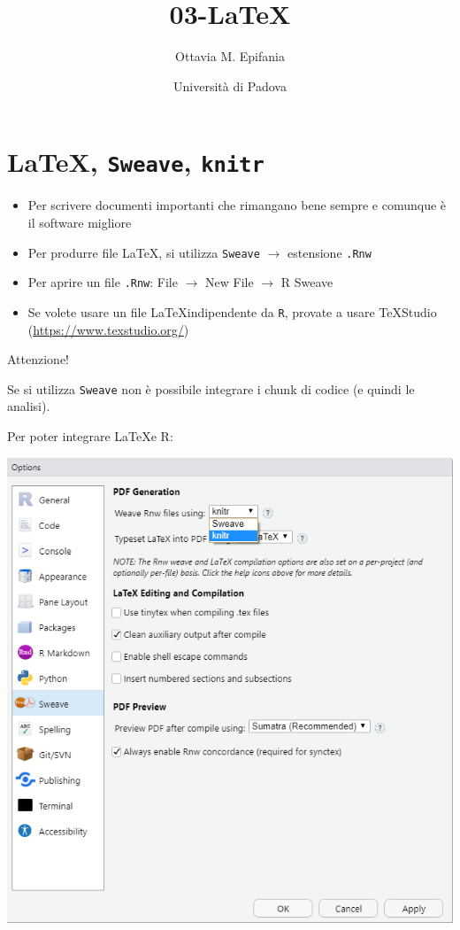 \documentclass{beamer} %
\begin{document}


\title{03-\LaTeX}
\author{Ottavia M. Epifania}
\date{Università di Padova}

\begin{frame}
\maketitle
\end{frame}

\section{\LaTeX, \texttt{Sweave}, \texttt{knitr}}

\begin{frame}

\begin{itemize}
\item Per scrivere documenti importanti che rimangano bene sempre e comunque è il software migliore

\item Per produrre file LaTeX, si utilizza \texttt{Sweave} $\rightarrow$ estensione \texttt{.Rnw}

\item Per aprire un file  \texttt{.Rnw}: File $\rightarrow$ New File $\rightarrow$ R Sweave 

\item Se volete usare un file \LaTeX indipendente da \texttt{R}, provate a usare TeXStudio (\url{https://www.texstudio.org/})
\end{itemize}


\end{frame}


\begin{frame}{Attenzione!}
 
 Se si utilizza \texttt{Sweave} non è possibile integrare i chunk di codice (e  quindi le analisi).

Per  poter integrare \LaTeX e R: 

\centering
\includegraphics[width=.60\linewidth]{img/knitr.png}

\end{frame}
\end{document}
